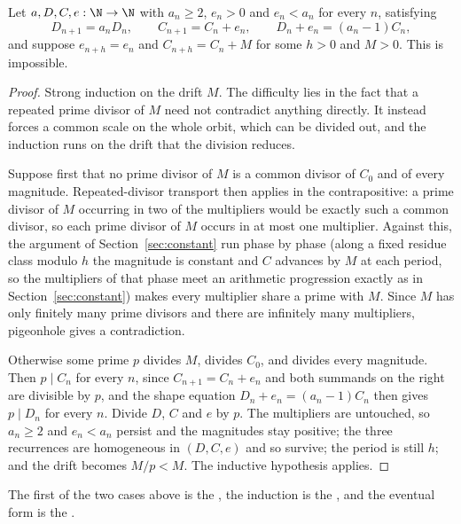 \documentclass[11pt]{article}
\begin{document}
\begin{theorem}\label{res:periodic}
Let $a,D,C,e:\N\to\N$ with $a_n\ge2$, $e_n>0$ and $e_n<a_n$ for every $n$,
satisfying
\[
 D_{n+1}=a_nD_n,\qquad C_{n+1}=C_n+e_n,\qquad D_n+e_n=(a_n-1)C_n ,
\]
and suppose $e_{n+h}=e_n$ and $C_{n+h}=C_n+M$ for some $h>0$ and $M>0$.  This
is impossible.
\end{theorem}

\begin{proof}
Strong induction on the drift $M$.  The difficulty lies in the fact that a
repeated prime divisor of $M$ need not contradict anything directly.  It
instead forces a common scale on the whole orbit, which can be divided out, and
the induction runs on the drift that the division reduces.

Suppose first that no prime divisor of $M$ is a common divisor of $C_0$ and of
every magnitude.  Repeated-divisor transport then applies in the
contrapositive: a prime divisor of $M$ occurring in two of the multipliers
would be exactly such a common divisor, so each prime divisor of $M$ occurs in
at most one multiplier.  Against this, the argument of
Section~\ref{sec:constant} run phase by phase (along a fixed residue class
modulo $h$ the magnitude is constant and $C$ advances by $M$ at each period, so
the multipliers of that phase meet an arithmetic progression exactly as in
Section~\ref{sec:constant}) makes every multiplier share a prime with $M$.
Since $M$ has only finitely many prime divisors and there are infinitely many
multipliers, pigeonhole gives a contradiction.

Otherwise some prime $p$ divides $M$, divides $C_0$, and divides every
magnitude.  Then $p\mid C_n$ for every $n$, since $C_{n+1}=C_n+e_n$ and both
summands on the right are divisible by $p$, and the shape equation
$D_n+e_n=(a_n-1)C_n$ then gives $p\mid D_n$ for every $n$.  Divide $D$, $C$ and
$e$ by $p$.  The multipliers are untouched, so $a_n\ge2$ and $e_n<a_n$ persist
and the magnitudes stay positive; the three recurrences are homogeneous in
$(D,C,e)$ and so survive; the period is still $h$; and the drift becomes
$M/p<M$.  The inductive hypothesis applies.
\end{proof}

\noindent The first of the two cases above is the
, the induction is the
, and the eventual form is the
.
\end{document}
